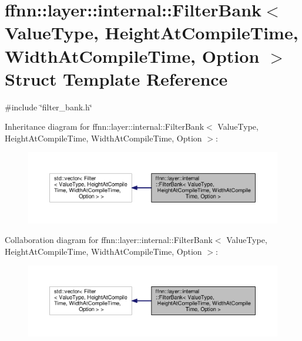 \hypertarget{structffnn_1_1layer_1_1internal_1_1_filter_bank}{\section{ffnn\-:\-:layer\-:\-:internal\-:\-:Filter\-Bank$<$ Value\-Type, Height\-At\-Compile\-Time, Width\-At\-Compile\-Time, Option $>$ Struct Template Reference}
\label{structffnn_1_1layer_1_1internal_1_1_filter_bank}
}


{\ttfamily \#include \char`\"{}filter\-\_\-bank.\-h\char`\"{}}



Inheritance diagram for ffnn\-:\-:layer\-:\-:internal\-:\-:Filter\-Bank$<$ Value\-Type, Height\-At\-Compile\-Time, Width\-At\-Compile\-Time, Option $>$\-:
\nopagebreak
\begin{figure}[H]
\begin{center}
\leavevmode
\includegraphics[width=350pt]{structffnn_1_1layer_1_1internal_1_1_filter_bank__inherit__graph}
\end{center}
\end{figure}


Collaboration diagram for ffnn\-:\-:layer\-:\-:internal\-:\-:Filter\-Bank$<$ Value\-Type, Height\-At\-Compile\-Time, Width\-At\-Compile\-Time, Option $>$\-:
\nopagebreak
\begin{figure}[H]
\begin{center}
\leavevmode
\includegraphics[width=350pt]{structffnn_1_1layer_1_1internal_1_1_filter_bank__coll__graph}
\end{center}
\end{figure}
